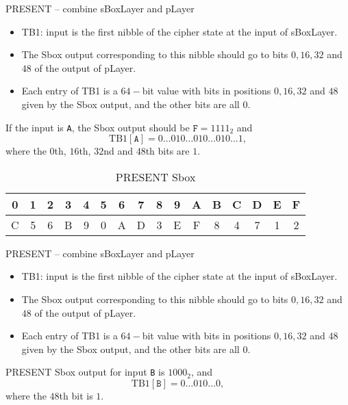 \begin{frame}{PRESENT -- combine sBoxLayer and pLayer}
\begin{itemize}
    \item TB1: input is the first nibble of the cipher state at the input of sBoxLayer.
\item The Sbox output corresponding to this nibble should go to bits $0,16,32$ and $48$ of the output of pLayer.
\item Each entry of TB1 is a $64-$bit value with bits in positions $0,16,32$ and $48$ given by the Sbox output, and the other bits are all $0$.
\end{itemize}
\begin{example}
If the input is \texttt{A}, the Sbox output should be $\texttt{F}=1111_2$ and
\[
\text{TB1}[\texttt{A}]=0\dots010\dots010\dots010\dots1,
\]
where the $0$th, $16$th, $32$nd and $48$th bits are $1$.
\end{example}
\begin{table}
\centering
\ttfamily
\begin{tabular}{cccccccccccccccc}\hline
 0 & 1 & 2 & 3 & 4 & 5 & 6 & 7 & 8 & 9 & A & B & C & D & E & F \\\hline
 C & 5 & 6 & B & 9 & 0 & A & D & 3 & E & F & 8 & 4 & 7 & 1 & 2\\\hline
\end{tabular}
\caption{PRESENT Sbox}
\end{table}
\end{frame}

\begin{frame}{PRESENT -- combine sBoxLayer and pLayer}
\begin{itemize}
    \item TB1: input is the first nibble of the cipher state at the input of sBoxLayer.
\item The Sbox output corresponding to this nibble should go to bits $0,16,32$ and $48$ of the output of pLayer.
\item Each entry of TB1 is a $64-$bit value with bits in positions $0,16,32$ and $48$ given by the Sbox output, and the other bits are all $0$.
\end{itemize}
\begin{example}
PRESENT Sbox output for input \texttt{B} is $1000_2$, and
\[
\text{TB1}[\texttt{B}]=0\dots010\dots0,
\]
where the $48$th bit is $1$.
\end{example}
\end{frame}

